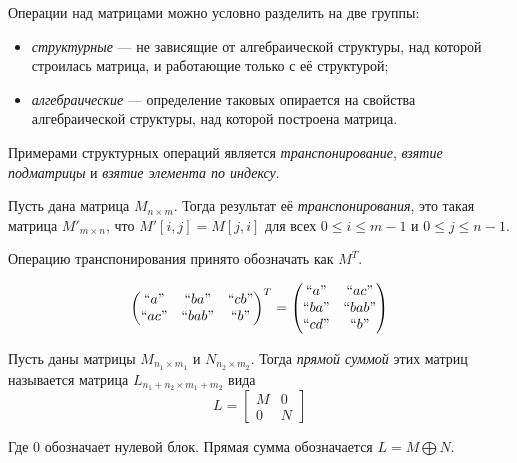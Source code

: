Операции над матрицами можно условно разделить на две группы:
\begin{itemize}
	\item \textit{структурные} --- не зависящие от алгебраической структуры, над которой строилась матрица, и работающие только с её структурой;
	\item \textit{алгебраические} --- определение таковых опирается на свойства алгебраической структуры, над которой построена матрица.
\end{itemize}

Примерами структурных операций является \textit{транспонирование}, \textit{взятие подматрицы} и \textit{взятие элемента по индексу}.

\begin{definition}
Пусть дана матрица $M_{n\times m}$. Тогда результат её \emph{транспонирования}, это такая матрица $M'_{m\times n}$, что $M'[i,j] = M[j,i]$ для всех $0\leq i \leq m - 1$ и $0\leq j \leq n - 1$.

Операцию транспонирования принято обозначать как $M^{T}$.

\end{definition}

\begin{example}
$$
\begin{pmatrix}
``a"  & ``ba"  & ``cb" \\
``ac" & ``bab" & ``b"  \\
\end{pmatrix}^T =
\begin{pmatrix}
``a"  & ``ac"  \\
``ba" & ``bab" \\
``cd" & ``b" \\
\end{pmatrix}
$$
\end{example}


\begin{definition}
	Пусть даны матрицы $M_{n_1\times m_1}$ и $N_{n_2\times m_2}$. Тогда \emph{прямой суммой} этих матриц называется матрица $L_{n_1+n_2 \times m_1+m_2}$ вида
	$$
		L = 
		  \left[
			\begin{matrix}
				M & 0 \\
				0 & N
			\end{matrix}
		  \right]
	$$
	
	Где 0 обозначает нулевой блок. Прямая сумма обозначается $L = M \bigoplus N$.
	
\end{definition}	


